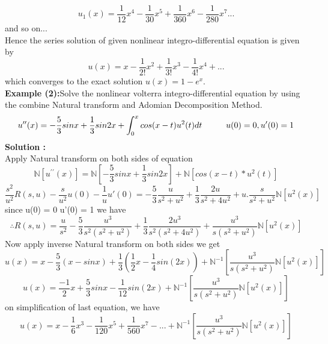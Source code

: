 \begin{equation}
u_{1}(x) = \frac{1}{12}x^4 - \frac{1}{30}x^5 + \frac{1}{360}x^6 - \frac{1}{280}x^7...    
\end{equation}
and so on...\\
Hence the series solution of given nonlinear integro-differential equation is given by
\begin{equation}
u(x) = x - \frac{1}{2!}x^2 + \frac{1}{3!}x^3 - \frac{1}{4!}x^4 + ...
\end{equation}
which converges to the exact solution $u(x) = 1 -  e^x.$\\
\textbf{Example (2):}Solve the nonlinear volterra integro-differential equation by using the combine Natural transform and Adomian Decomposition Method.
 \begin{equation*}
 {u^{\prime\prime}(x) = - \frac{5}{3}sin{x} + \frac{1}{3}sin{2x} + \int_{0}^{x}cos{(x-t)}u^2(t) dt {\hspace{1 cm}} u(0) = 0 , u'(0) = 1}
 \end{equation*}
 \textbf{Solution :}\\
 Apply Natural transform on both sides of equation 
 \begin{equation*}
\mathbb{N}[u^{\prime\prime}(x)] = \mathbb{N}[- \frac{5}{3}sin{x} + \frac{1}{3}sin{2x} ] + \mathbb{N}[cos{(x-t)} * u^2(t)]
\end{equation*}
\begin{equation*}
\frac{s^2}{u^2}R(s,u) - \frac{s}{u^2}u(0) - \frac{1}{u}u'(0) = - \frac{5}{3}\frac{u}{s^2+u^2} + \frac{1}{3}\frac{2u}{s^2+4u^2} + u.\frac{s}{s^2+u^2}\mathbb{N}[u^2(x)]
\end{equation*}
since u(0) = 0 u'(0) = 1 we have
\begin{equation}
\therefore R(s,u) = \frac{u}{s^2} - \frac{5}{3}\frac{u^3}{s^2(s^2+u^2)} + \frac{1}{3}\frac{2u^3}{s^2(s^2+4u^2)} + \frac{u^3}{s(s^2+u^2)}\mathbb{N}[u^2(x)]
\end{equation}
Now apply inverse Natural transform on both sides we get
\begin{equation*}
u(x) = x - \frac{5}{3}(x - sinx) + \frac{1}{3}(\frac{1}{2}x - \frac{1}{4}sin(2x)) + \mathbb{N}^{-1}[\frac{u^3}{s(s^2+u^2)}\mathbb{N}[u^2(x)]]
\end{equation*}
\begin{equation*}
u(x) = \frac{-1}{2}x + \frac{5}{3}sinx - \frac{1}{12}sin(2x) + \mathbb{N}^{-1}[\frac{u^3}{s(s^2+u^2)} \mathbb{N}[u^2(x)]]
\end{equation*}
on simplification of last equation, we have
\begin{equation}
{u(x) = x - \frac{1}{6}x^3 - \frac{1}{120}x^5 + \frac{1}{560}x^7 - ... +\mathbb{N}^{-1}[\frac{u^3}{s(s^2+u^2)}\mathbb{N}[u^2(x)]] }
\end{equation}
